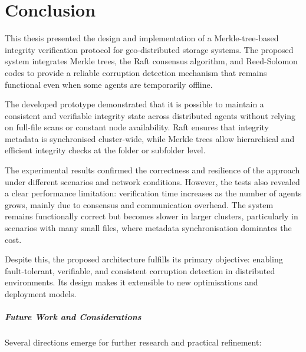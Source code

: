 \chapter{Conclusion}

This thesis presented the design and implementation of a Merkle-tree-based integrity verification protocol for geo-distributed storage systems.
The proposed system integrates Merkle trees, the Raft consensus algorithm, and Reed-Solomon codes to provide a reliable corruption detection mechanism that remains functional even when some agents are temporarily offline.

The developed prototype demonstrated that it is possible to maintain a consistent and verifiable integrity state across distributed agents without relying on full-file scans or constant node availability.
Raft ensures that integrity metadata is synchronised cluster-wide, while Merkle trees allow hierarchical and efficient integrity checks at the folder or subfolder level.

The experimental results confirmed the correctness and resilience of the
approach under different scenarios and network conditions.
However, the tests also revealed a clear performance limitation: verification time increases as the number of agents grows, mainly due to consensus and communication overhead.
The system remains functionally correct but becomes slower in larger clusters, particularly in scenarios with many small files, where metadata synchronisation dominates the cost.

Despite this, the proposed architecture fulfills its primary objective: enabling fault-tolerant, verifiable, and consistent corruption detection in distributed environments.
Its design makes it extensible to new optimisations and deployment models.

\paragraph{Future Work and Considerations}

Several directions emerge for further research and practical refinement:

